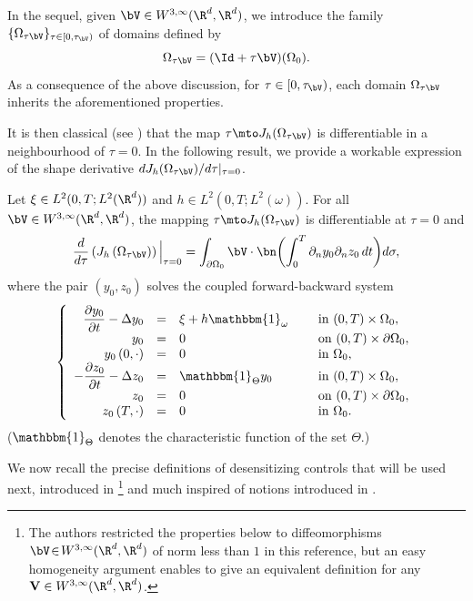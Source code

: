 In the sequel, given $\bV\in W^{3,\infty}(\R^d, \R^d)$, we introduce the family $\{\Omega_{\tau\bV}\}_{\tau\in [0,\tau_{\bV})}$ of domains defined by
\[
\Omega_{\tau\bV}= (\Id+\tau\bV)(\Omega_0).
\]
As a consequence of the above discussion, for $\tau \in [0,\tau_{\bV})$, each domain $\Omega_{\tau\bV}$ inherits the aforementioned properties.

It is then classical (see \eg \cite[Chap.\,5]{Henrot-Pierre-2005}) that the map $\tau \mto J_h(\Omega_{\tau\bV})$ is differentiable in a neighbourhood of $\tau = 0$. In the following result, we provide a workable expression of the shape derivative $dJ_h(\Omega_{\tau\bV})/d\tau|_{\tau=0}$.

\begin{proposition}
\label{Prop-J-differentiable}
Let $\xi \in L^2(0,T; L^2(\R^d))$ and $h \in L^2(0,T; L^2(\omega))$. For all $ \bV \in W^{3, \infty} (\R^d, \R^d)$, the mapping $\tau \mto J_h(\Omega_{\tau\bV})$ is differentiable at $\tau = 0$ and
\begin{equation}
\dfrac{d }{d \tau}\left({J}_h\left(\Omega_{\tau\bV} \right)\right)\Big|_{\tau=0}
\label{Diff-J-V-2}
=
\int_{\partial\Omega_0} \bV \cdot \bn \biggl(\int_0^T \partial_n y_0 \partial_n z_0 \, dt\biggr) d\sigma,
\end{equation}
where the pair $(y_0,z_0)$ solves the coupled forward-backward system
\begin{equation}
\label{y-Omega-0-h}
\left\{
\begin{array}{rcll}
\dfrac{\partial y_0}{\partial t}-\Delta y_0 &=&\xi +h\mathbbm{1}_{\omega}\quad&\text{ in }(0,T) \times \Omega_0,
\\
y_0 &=& 0 &\text{ on }(0,T) \times \partial \Omega_0,
\\
y_0\left(0,\cdot\right) &=& 0 &\text{ in }\Omega_0,
\\
-\dfrac{\partial z_0}{\partial t}-\Delta z_0 &=&\mathbbm{1}_{\Theta}y_0 &\text{ in }(0,T) \times \Omega_0,
\\
z_0 &=& 0 &\text{ on }(0,T) \times \partial \Omega_0,
\\
z_0\left(T,\cdot\right) &=& 0 &\text{ in }\Omega_0.
\end{array}
\right.
\end{equation}
($\mathbbm{1}_\Theta$ denotes the characteristic function of the set $\Theta$.)
\end{proposition}

We now recall the precise definitions of desensitizing controls that will be used next, introduced in \cite[Def.\,1.1]{Lissy-Privat-Simpore}\footnote{The authors restricted the properties below to diffeomorphisms \hbox{$\bV \!\in\! W^{3,\infty}(\R^d, \R^d)$} of norm less than $1$ in this reference, but an easy homogeneity argument enables to give an equivalent definition for any $\mathbf V \in W^{3,\infty}(\R^d, \R^d)$.} and much inspired of notions introduced in \cite{Lions-Sentinelles-1992,Bodart-Fabre}.

